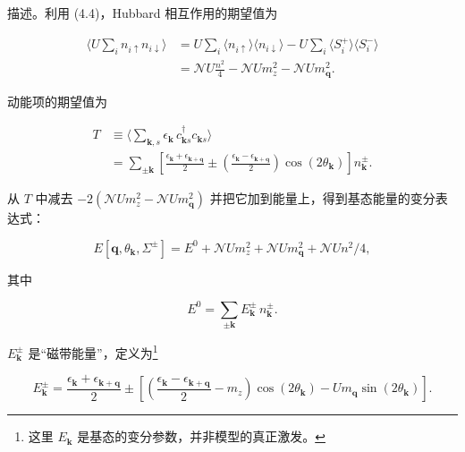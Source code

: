 描述。利用 (4.4)，Hubbard 相互作用的期望值为

\begin{align*}
\Big\langle U \sum_ {i} n _ {i \uparrow} n _ {i \downarrow} \Big\rangle & = U \sum_ {i} \langle n _ {i \uparrow} \rangle \langle n _ {i \downarrow} \rangle - U \sum_ {i} \langle S _ {i} ^ {+} \rangle \langle S _ {i} ^ {-} \rangle\\
& = \mathcal {N} U \frac {n ^ {2}}{4} - \mathcal {N} U m _ {z} ^ {2} - \mathcal {N} U m _ {\mathbf {q}} ^ {2}.
\tag{4.11}
\end{align*}

动能项的期望值为

\begin{align*}
T & \equiv \Big\langle \sum_ {\mathbf {k}, s} \epsilon_ {\mathbf {k}} \, c _ {\mathbf {k} s} ^ {\dagger} c _ {\mathbf {k} s} \Big\rangle\\
& = \sum_ {\pm \mathbf {k}} \left[ \frac {\epsilon_ {\mathbf {k}} + \epsilon_ {\mathbf {k} + \mathbf {q}}}{2} \pm \left( \frac {\epsilon_ {\mathbf {k}} - \epsilon_ {\mathbf {k} + \mathbf {q}}}{2} \right) \cos ( 2 \theta_ {\mathbf {k}} ) \right] n _ {\mathbf {k}} ^ {\pm}.
\tag{4.12}
\end{align*}

从 $T$ 中减去 $-2(\mathcal{N}Um_{z}^{2}-\mathcal{N}Um_{\mathbf{q}}^{2})$ 并把它加到能量上，得到基态能量的变分表达式：

\begin{equation*}
E [ \mathbf {q}, \theta_ {\mathbf {k}}, \Sigma^ {\pm} ] = E ^ {0} + \mathcal {N} U m _ {z} ^ {2} + \mathcal {N} U m _ {\mathbf {q}} ^ {2} + \mathcal {N} U n ^ {2} / 4,
\tag{4.13}
\end{equation*}

其中

\begin{equation*}
E ^ {0} = \sum_ {\pm \mathbf {k}} E _ {\mathbf {k}} ^ {\pm} \, n _ {\mathbf {k}} ^ {\pm}.
\tag{4.14}
\end{equation*}

$E_{\mathbf{k}}^{\pm}$ 是“磁带能量”，定义为\footnote{这里 $E_{\mathbf{k}}$ 是基态的变分参数，并非模型的真正激发。}

\begin{equation*}
E _ {\mathbf {k}} ^ {\pm} = \frac {\epsilon_ {\mathbf {k}} + \epsilon_ {\mathbf {k} + \mathbf {q}}}{2} \pm \left[ \left( \frac {\epsilon_ {\mathbf {k}} - \epsilon_ {\mathbf {k} + \mathbf {q}}}{2} - m _ {z} \right) \cos ( 2 \theta_ {\mathbf {k}} ) - U m _ {\mathbf {q}} \sin ( 2 \theta_ {\mathbf {k}} ) \right].
\tag{4.15}
\end{equation*}

